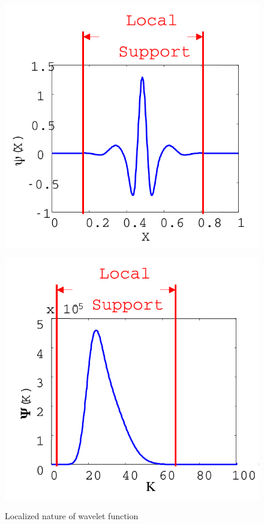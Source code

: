 \begin{figure}[h!]
\begin{minipage}{0.5\linewidth}
\includegraphics[scale=0.7]{fig/wlt.pdf}\\
\end{minipage}
\begin{minipage}{0.5\linewidth}
\includegraphics[scale=0.7]{fig/wlt_fft.pdf}\\
\end{minipage}
\caption{Localized nature of wavelet function} \label{fig:wlt}
\end{figure}

